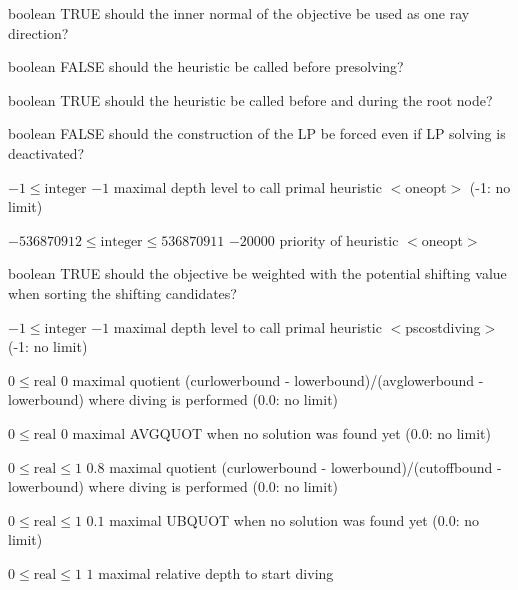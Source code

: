 %
{boolean}%
{TRUE}%
{should the inner normal of the objective be used as one ray direction?}%
{}

%
{boolean}%
{FALSE}%
{should the heuristic be called before presolving?}%
{}

%
{boolean}%
{TRUE}%
{should the heuristic be called before and during the root node?}%
{}

%
{boolean}%
{FALSE}%
{should the construction of the LP be forced even if LP solving is deactivated?}%
{}

%
{$-1\leq\textrm{integer}$}%
{$-1$}%
{maximal depth level to call primal heuristic $<$oneopt$>$ (-1: no limit)}%
{}

%
{$-536870912\leq\textrm{integer}\leq536870911$}%
{$-20000$}%
{priority of heuristic $<$oneopt$>$}%
{}

%
{boolean}%
{TRUE}%
{should the objective be weighted with the potential shifting value when sorting the shifting candidates?}%
{}

%
{$-1\leq\textrm{integer}$}%
{$-1$}%
{maximal depth level to call primal heuristic $<$pscostdiving$>$ (-1: no limit)}%
{}

%
{$0\leq\textrm{real}$}%
{$0$}%
{maximal quotient (curlowerbound - lowerbound)/(avglowerbound - lowerbound) where diving is performed (0.0: no limit)}%
{}

%
{$0\leq\textrm{real}$}%
{$0$}%
{maximal AVGQUOT when no solution was found yet (0.0: no limit)}%
{}

%
{$0\leq\textrm{real}\leq1$}%
{$0.8$}%
{maximal quotient (curlowerbound - lowerbound)/(cutoffbound - lowerbound) where diving is performed (0.0: no limit)}%
{}

%
{$0\leq\textrm{real}\leq1$}%
{$0.1$}%
{maximal UBQUOT when no solution was found yet (0.0: no limit)}%
{}

%
{$0\leq\textrm{real}\leq1$}%
{$1$}%
{maximal relative depth to start diving}%
{}

